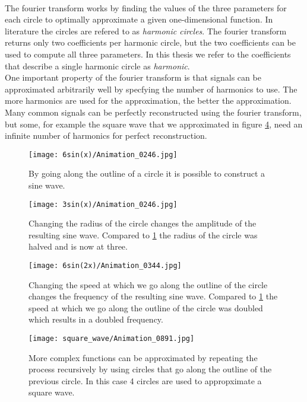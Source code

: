 \documentclass[thesis.tex]{subfiles}
\begin{document}
\\
The fourier transform works by finding the values of the three parameters for each circle to optimally approximate a given one-dimensional function. In literature the circles are refered to as \textit{harmonic circles}. The fourier transform returns only two coefficients per harmonic circle, but the two coefficients can be used to compute all three parameters. In this thesis we refer to the coefficients that describe a single harmonic circle as \textit{harmonic}. 
 \\ One important property of the fourier transform is that signals can be approximated arbitrarily well by specfying the number of harmonics to use. The more harmonics are used for the approximation, the better the approximation. Many common signals can be perfectly reconstructed using the fourier transform, but some, for example the square wave that we approximated in figure \ref{fig:fourier_square}, need an infinite number of harmonics for perfect reconstruction.\\ 

\begin{figure}[h]
\centering
\texttt{[image: 6sin(x)/Animation\_0246.jpg]}
\caption{By going along the outline of a circle it is possible to construct a sine wave.}
\label{fig:fourier}
\end{figure}

\begin{figure}[h]
\centering
\texttt{[image: 3sin(x)/Animation\_0246.jpg]}
\caption{Changing the radius of the circle changes the amplitude of the resulting sine wave. Compared to \ref{fig:fourier} the radius of the circle was halved and is now at three.}
\label{fig:fourier_radius}
\end{figure}

\begin{figure}[h]
\centering
\texttt{[image: 6sin(2x)/Animation\_0344.jpg]}
\caption{Changing the speed at which we go along the outline of the circle changes the frequency of the resulting sine wave. Compared to \ref{fig:fourier} the speed at which we go along the outline of the circle was doubled which results in a doubled frequency.}
\label{fig:fourier_speed}
\end{figure}

\begin{figure}[h]
\centering
\texttt{[image: square\_wave/Animation\_0891.jpg]}
\caption{More complex functions can be approximated by repeating the process recursively by using circles that go along the outline of the previous circle. In this case 4 circles are used to appropximate a square wave.}
\label{fig:fourier_square}
\end{figure}
\end{document}
